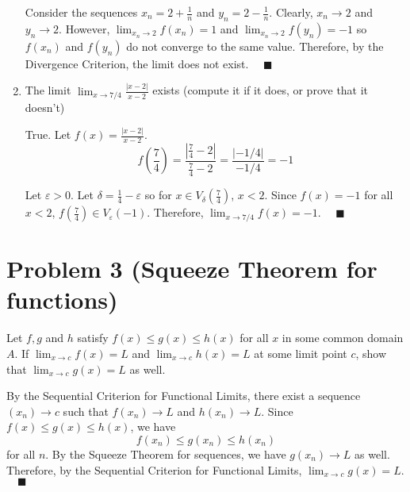 \documentclass[12pt]{article}
\newcommand{\qed}{\quad \blacksquare}
\newcommand{\abs}[1]{\left\vert #1 \right\vert}
\newcommand{\ep}{\varepsilon}
\begin{document}
\begin{enumerate}
            Consider the sequences $x_n = 2 + \frac{1}{n}$ and $y_n = 2 - \frac{1}{n}$. Clearly, $x_n \to 2$ and $y_n \to 2$. However, $\lim_{x_n \to 2} f(x_n) = 1$ and $\lim_{x_n \to 2} f(y_n) = -1$ so $f(x_n)$ and $f(y_n)$ do not converge to the same value. Therefore, by the Divergence Criterion, the limit does not exist. $\qed$
        \color{black}

	\item The limit $\lim_{x\to 7/4}\frac{\abs{x-2}}{x-2}$ exists (compute it if it does, or prove that it doesn't)
	
        \color{blue}
            True. Let $f(x) = \frac{\abs{x - 2}}{x - 2}$. 
            \[f(\frac{7}{4}) = \frac{\abs{\frac{7}{4} - 2}}{\frac{7}{4} - 2} = \frac{\abs{-1/4}}{-1/4} = -1\]
                        
            Let $\ep > 0$. Let $\delta = \frac{1}{4} - \ep$ so for $x \in V_{\delta}(\frac{7}{4})$, $x < 2$. Since $f(x) = -1$ for all $x < 2$, $f(\frac{7}{4}) \in V_{\ep}(-1)$. Therefore, $\lim_{x \to 7/4} f(x) = -1$. $\qed$            
        \color{black}

\end{enumerate}
\pagebreak

\section*{Problem 3 (Squeeze Theorem for functions)}
Let $f,g$ and $h$ satisfy $f(x)\leq g(x)\leq h(x)$ for all $x$ in some common domain $A$. If $\lim_{x\to c}f(x)=L$ and $\lim_{x\to c}h(x)=L$ at some limit point $c$, show that $\lim_{x\to c}g(x)=L$ as well.

    \color{blue}
        By the Sequential Criterion for Functional Limits, there exist a sequence $(x_n) \to c$ such that $f(x_n) \to L$ and $h(x_n) \to L$. Since $f(x) \leq g(x) \leq h(x)$, we have 
        \[f(x_n) \leq g(x_n) \leq h(x_n)\] 
        for all $n$. By the Squeeze Theorem for sequences, we have $g(x_n) \to L$ as well. Therefore, by the Sequential Criterion for Functional Limits, $\lim_{x\to c}g(x) = L$. $\qed$
    \color{black}

\pagebreak
\end{document}
